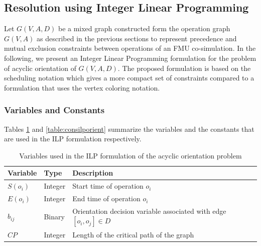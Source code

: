 %

\subsection{Resolution using Integer Linear Programming}

Let $G(V,A,D)$ be a mixed graph constructed form the operation graph $G(V,A)$ as described in the previous sections to represent precedence and mutual exclusion constraints between operations of an FMU co-simulation. In the following, we present an Integer Linear Programming formulation for the problem of acyclic orientation of $G(V,A,D)$. The proposed formulation is based on the scheduling notation which gives a more compact set of constraints compared to a formulation that uses the vertex coloring notation.

\subsubsection{Variables and Constants}

Tables \ref{table:varilporient} and \ref{table:consilporient} summarize the variables and the constants that are used in the ILP formulation respectively.

\begin{table}[!htbp]
\caption{Variables used in the ILP formulation of the acyclic orientation problem}
\centering
\label{table:varilporient}
\begin{tabular}{l l l}
\toprule
Variable & Type & Description  \\
\midrule
 $S(o_i)$ & Integer & Start time of operation $o_i$\\
 $E(o_i)$ & Integer & End time of operation $o_i$\\
 $b_{ij}$ & Binary & Orientation decision variable associated with edge $[o_i,o_j] \in D$\\
 $CP$ & Integer & Length of the critical path of the graph\\
\bottomrule
\end{tabular}
\end{table}


